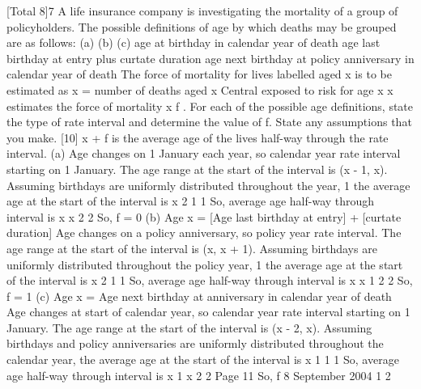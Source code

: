 \documentclass[a4paper,12pt]{article}
\begin{document}
[Total 8]7
A life insurance company is investigating the mortality of a group of policyholders.
The possible definitions of age by which deaths may be grouped are as follows:
(a)
(b)
(c)
age at birthday in calendar year of death
age last birthday at entry plus curtate duration
age next birthday at policy anniversary in calendar year of death
The force of mortality for lives labelled aged x is to be estimated as
x
=
number of deaths aged x
Central exposed to risk for age x
x estimates
the force of mortality
x f
.
For each of the possible age definitions, state the type of rate interval and determine
the value of f. State any assumptions that you make.
[10]
x + f is the average age of the lives half-way through the rate interval.
(a)
Age changes on 1 January each year, so calendar year rate interval starting on
1 January.
The age range at the start of the interval is (x - 1, x).
Assuming birthdays are uniformly distributed throughout the year,
1
the average age at the start of the interval is x
2
1 1
So, average age half-way through interval is x
x
2 2
So, f = 0
(b)
Age x = [Age last birthday at entry] + [curtate duration]
Age changes on a policy anniversary, so policy year rate interval.
The age range at the start of the interval is (x, x + 1).
Assuming birthdays are uniformly distributed throughout the policy year,
1
the average age at the start of the interval is x
2
1 1
So, average age half-way through interval is x
x 1
2 2
So, f = 1
(c)
Age x = Age next birthday at anniversary in calendar year of death
Age changes at start of calendar year, so calendar year rate interval starting on
1 January.
The age range at the start of the interval is (x - 2, x).
Assuming birthdays and policy anniversaries are uniformly distributed
throughout the calendar year, the average age at the start of the interval is x 1
1
1
So, average age half-way through interval is x 1
x
2
2
Page 11 %
So, f
8
September 2004
1
2
\end{document}

